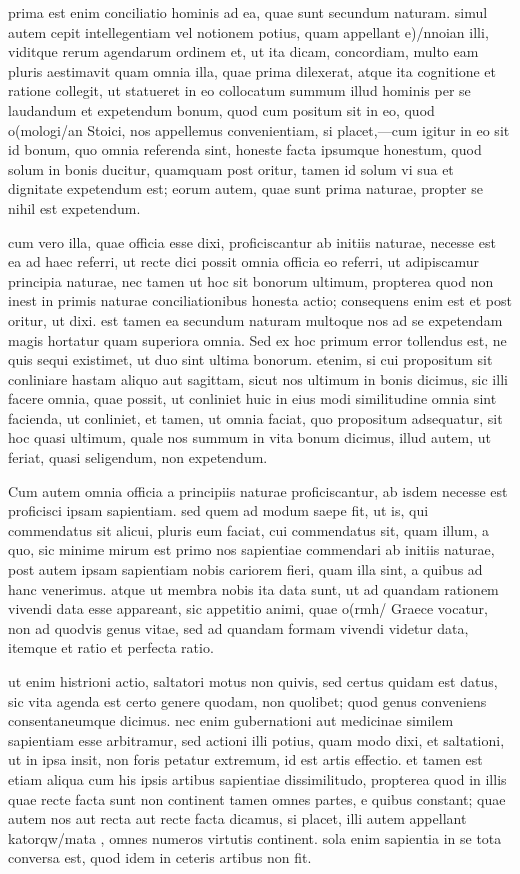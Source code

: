  prima est enim conciliatio hominis ad ea, quae sunt secundum naturam. simul autem cepit intellegentiam vel notionem potius, quam appellant e)/nnoian illi, viditque rerum agendarum ordinem et, ut ita dicam, concordiam, multo eam pluris aestimavit quam omnia illa, quae prima dilexerat, atque ita cognitione et ratione collegit, ut statueret in eo collocatum summum illud hominis per se laudandum et expetendum bonum, quod cum positum sit in eo, quod o(mologi/an Stoici, nos appellemus convenientiam, si placet,—cum igitur in eo sit id bonum, quo omnia referenda sint, honeste facta ipsumque honestum, quod solum in bonis ducitur, quamquam post oritur, tamen id solum vi sua et dignitate expetendum est; eorum autem, quae sunt prima naturae, propter se nihil est expetendum.

 cum vero illa, quae officia esse dixi, proficiscantur ab initiis naturae, necesse est ea ad haec referri, ut recte dici possit omnia officia eo referri, ut adipiscamur principia naturae, nec tamen ut hoc sit bonorum ultimum, propterea quod non inest in primis naturae conciliationibus honesta actio; consequens enim est et post oritur, ut dixi. est tamen ea secundum naturam multoque nos ad se expetendam magis hortatur quam superiora omnia. Sed ex hoc primum error tollendus est, ne quis sequi existimet, ut duo sint ultima bonorum. etenim, si cui propositum sit conliniare hastam aliquo aut sagittam, sicut nos ultimum in bonis dicimus, sic illi facere omnia, quae possit, ut conliniet huic in eius modi similitudine omnia sint facienda, ut conliniet, et tamen, ut omnia faciat, quo propositum adsequatur, sit hoc quasi ultimum, quale nos summum in vita bonum dicimus, illud autem, ut feriat, quasi seligendum, non expetendum.

 Cum autem omnia officia a principiis naturae proficiscantur, ab isdem necesse est proficisci ipsam sapientiam. sed quem ad modum saepe fit, ut is, qui commendatus sit alicui, pluris eum faciat, cui commendatus sit, quam illum, a quo, sic minime mirum est primo nos sapientiae commendari ab initiis naturae, post autem ipsam sapientiam nobis cariorem fieri, quam illa sint, a quibus ad hanc venerimus. atque ut membra nobis ita data sunt, ut ad quandam rationem vivendi data esse appareant, sic appetitio animi, quae o(rmh/ Graece vocatur, non ad quodvis genus vitae, sed ad quandam formam vivendi videtur data, itemque et ratio et perfecta ratio.

 ut enim histrioni actio, saltatori motus non quivis, sed certus quidam est datus, sic vita agenda est certo genere quodam, non quolibet; quod genus conveniens consentaneumque dicimus. nec enim gubernationi aut medicinae similem sapientiam esse arbitramur, sed actioni illi potius, quam modo dixi, et saltationi, ut in ipsa insit, non foris petatur extremum, id est artis effectio. et tamen est etiam aliqua cum his ipsis artibus sapientiae dissimilitudo, propterea quod in illis quae recte facta sunt non continent tamen omnes partes, e quibus constant; quae autem nos aut recta aut recte facta dicamus, si placet, illi autem appellant katorqw/mata , omnes numeros virtutis continent. sola enim sapientia in se tota conversa est, quod idem in ceteris artibus non fit.

